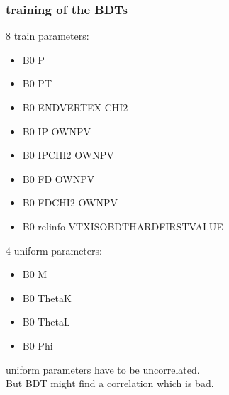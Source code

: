 \documentclass{beamer}
\begin{document}
\begin{frame}
  \frametitle{training of the BDTs}
  8 train parameters:
  \begin{itemize}
    \item B0 P
    \item B0 PT
    \item B0 ENDVERTEX CHI2
    \item B0 IP OWNPV
    \item B0 IPCHI2 OWNPV
    \item B0 FD OWNPV
    \item B0 FDCHI2 OWNPV
    \item B0 relinfo VTXISOBDTHARDFIRSTVALUE
  \end{itemize}
  4 uniform parameters:
  \begin{itemize}
    \item B0 M
    \item B0 ThetaK
    \item B0 ThetaL
    \item B0 Phi
  \end{itemize}
  uniform parameters have to be uncorrelated. \\
  But BDT might find a correlation which is bad.
\end{frame}

%
%
%

%
%
%
%
\end{document}
